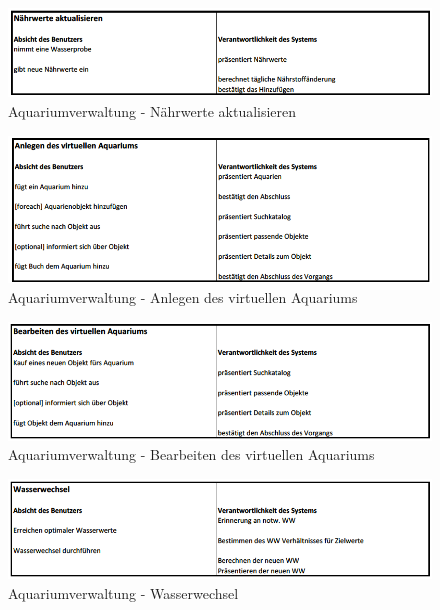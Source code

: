 \begin{figure}
	\centering
	\includegraphics[width=\linewidth,height=\textheight,
keepaspectratio]{euc_aq_2}
	\caption{Aquariumverwaltung - Nährwerte aktualisieren}
	\label{euc:aq:2}
\end{figure}

\begin{figure}
	\centering
	\includegraphics[width=\linewidth,height=\textheight,
keepaspectratio]{euc_aq_4}
	\caption{Aquariumverwaltung - Anlegen des virtuellen Aquariums}
	\label{euc:aq:4}
\end{figure}

\begin{figure}
	\centering
	\includegraphics[width=\linewidth,height=\textheight,
keepaspectratio]{euc_aq_3}
	\caption{Aquariumverwaltung - Bearbeiten des virtuellen Aquariums}
	\label{euc:aq:3}
\end{figure}

\begin{figure}
	\centering
	\includegraphics[width=\linewidth,height=\textheight,
keepaspectratio]{euc_aq_5}
	\caption{Aquariumverwaltung - Wasserwechsel}
	\label{euc:aq:5}
\end{figure}

